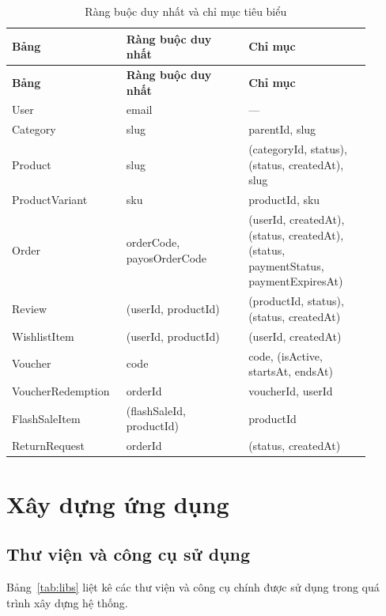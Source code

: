 \begin{longtable}{|>{\raggedright\arraybackslash}p{0.255\linewidth}|>{\raggedright\arraybackslash}p{0.32\linewidth}|>{\raggedright\arraybackslash}p{0.32\linewidth}|}
\caption{Ràng buộc duy nhất và chỉ mục tiêu biểu}\label{tab:indexes}\\
\hline
\rowcolor{gray!12}\textbf{Bảng} & \textbf{Ràng buộc duy nhất} & \textbf{Chỉ mục} \\ \hline
\endfirsthead
\hline
\rowcolor{gray!12}\textbf{Bảng} & \textbf{Ràng buộc duy nhất} & \textbf{Chỉ mục} \\ \hline
\endhead
User & email & --- \\ \hline
Category & slug & parentId, slug \\ \hline
Product & slug & (categoryId, status), (status, createdAt), slug \\ \hline
ProductVariant & sku & productId, sku \\ \hline
Order & orderCode, payosOrderCode & (userId, createdAt), (status, createdAt), (status, paymentStatus, paymentExpiresAt) \\ \hline
Review & (userId, productId) & (productId, status), (status, createdAt) \\ \hline
WishlistItem & (userId, productId) & (userId, createdAt) \\ \hline
Voucher & code & code, (isActive, startsAt, endsAt) \\ \hline
VoucherRedemption & orderId & voucherId, userId \\ \hline
FlashSaleItem & (flashSaleId, productId) & productId \\ \hline
ReturnRequest & orderId & (status, createdAt) \\ \hline
\end{longtable}

\section{Xây dựng ứng dụng}

\subsection{Thư viện và công cụ sử dụng}

Bảng~\ref{tab:libs} liệt kê các thư viện và công cụ chính được sử dụng trong quá trình xây dựng
hệ thống.


